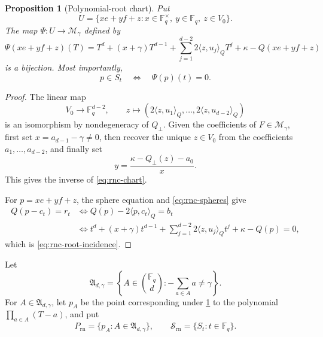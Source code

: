 \documentclass[11pt,letterpaper]{amsart}
\newtheorem{proposition}[proposition]{Proposition}
\theoremstyle{definition}
\theoremstyle{remark}
\newcommand{\1}{\mathbf 1}
\newcommand{\ip}[2]{\langle #1,#2\rangle_Q}
\begin{document}
\begin{proposition}[Polynomial-root chart]\label{prop:rnc-chart}
Put
\[
 U=\{xe+yf+z:x\in\mathbb F_q^\times,\ y\in\mathbb F_q,\ z\in V_0\}.
\]
The map $\Psi:U\to\mathcal M_\gamma$ defined by
\begin{equation}\label{eq:rnc-chart}
 \Psi(xe+yf+z)(T)
 =T^d+(x+\gamma)T^{d-1}
  +\sum_{j=1}^{d-2}2\ip{z}{u_j}T^j
  +\kappa-Q(xe+yf+z)
\end{equation}
is a bijection.  Most importantly,
\begin{equation}\label{eq:rnc-root-incidence}
 p\in S_t\quad\Longleftrightarrow\quad\Psi(p)(t)=0.
\end{equation}
\end{proposition}

\begin{proof}
The linear map
\[
 V_0\longrightarrow\mathbb F_q^{d-2},
 \qquad
 z\longmapsto(2\ip{z}{u_1},\ldots,2\ip{z}{u_{d-2}})
\]
is an isomorphism by nondegeneracy of $Q_\perp$.  Given the coefficients of $F\in\mathcal M_\gamma$, first set $x=a_{d-1}-\gamma\ne0$, then recover the unique $z\in V_0$ from the coefficients $a_1,\ldots,a_{d-2}$, and finally set
\[
 y=\frac{\kappa-Q_\perp(z)-a_0}{x}.
\]
This gives the inverse of \eqref{eq:rnc-chart}.

For $p=xe+yf+z$, the sphere equation and \eqref{eq:rnc-spheres} give
\begin{align*}
 Q(p-c_t)=r_t
 &\Longleftrightarrow
 Q(p)-2\ip{p}{c_t}=b_t\\
 &\Longleftrightarrow
 t^d+(x+\gamma)t^{d-1}
 +\sum_{j=1}^{d-2}2\ip{z}{u_j}t^j
 +\kappa-Q(p)=0,
\end{align*}
which is \eqref{eq:rnc-root-incidence}.
\end{proof}

Let
\[
 \mathfrak A_{d,\gamma}=
 \left\{A\in\binom{\mathbb F_q}{d}:-\sum_{a\in A}a\ne\gamma\right\}.
\]
For $A\in\mathfrak A_{d,\gamma}$, let $p_A$ be the point corresponding under \cref{prop:rnc-chart} to the polynomial $\prod_{a\in A}(T-a)$, and put
\begin{equation}\label{eq:rnc-system}
 P_{\mathrm{rn}}=\{p_A:A\in\mathfrak A_{d,\gamma}\},
 \qquad
 \mathcal S_{\mathrm{rn}}=\{S_t:t\in\mathbb F_q\}.
\end{equation}
\end{document}
